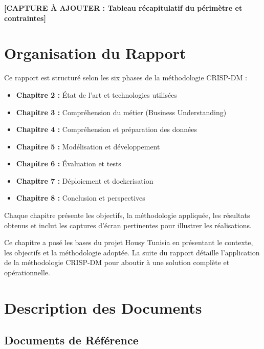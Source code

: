 \textbf{[CAPTURE À AJOUTER : Tableau récapitulatif du périmètre et contraintes]}

\section{Organisation du Rapport}

Ce rapport est structuré selon les six phases de la méthodologie CRISP-DM :

\begin{itemize}
    \item \textbf{Chapitre 2 :} État de l'art et technologies utilisées
    \item \textbf{Chapitre 3 :} Compréhension du métier (Business Understanding)
    \item \textbf{Chapitre 4 :} Compréhension et préparation des données
    \item \textbf{Chapitre 5 :} Modélisation et développement
    \item \textbf{Chapitre 6 :} Évaluation et tests
    \item \textbf{Chapitre 7 :} Déploiement et dockerisation
    \item \textbf{Chapitre 8 :} Conclusion et perspectives
\end{itemize}

Chaque chapitre présente les objectifs, la méthodologie appliquée, les résultats obtenus et inclut les captures d'écran pertinentes pour illustrer les réalisations.

\begin{resultbox}
Ce chapitre a posé les bases du projet Housy Tunisia en présentant le contexte, les objectifs et la méthodologie adoptée. La suite du rapport détaille l'application de la méthodologie CRISP-DM pour aboutir à une solution complète et opérationnelle.
\end{resultbox}


\section{Description des Documents}

\subsection{Documents de Référence}

